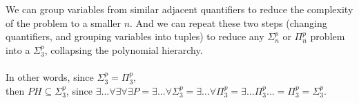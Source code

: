 \documentclass[letterpaper,notitlepage,twoside]{article}
\begin{document}
\\\\
We can group variables from similar adjacent quantifiers to reduce the complexity of the problem to a smaller $n$. And we can repeat these two steps (changing quantifiers, and grouping variables into tuples) to reduce any $\Sigma_n^p$ or $\Pi_n^p$ problem into a $\Sigma_3^p$, collapsing the polynomial hierarchy.
\\\\
In other words, since $\Sigma_3^p = \Pi_3^p$, \\
then $PH \subseteq \Sigma_3^p$, since $\exists...\forall\exists\forall\exists P = \exists...\forall\Sigma_3^p = \exists...\forall\Pi_3^p = \exists...\Pi_3^p ... = \Pi_3^p = \Sigma_3^p$.
\end{document}
